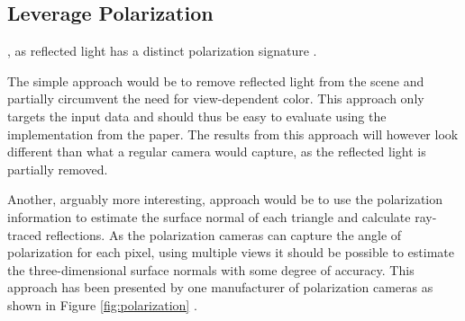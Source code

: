 \subsection{Leverage Polarization}

, as reflected light has a distinct polarization signature \cite{lingUniversityPhysicsVolume2016}.


The simple approach would be to remove reflected light from the scene and partially circumvent the need for view-dependent color.
This approach only targets the input data and should thus be easy to evaluate using the implementation from the paper.
The results from this approach will however look different than what a regular camera would capture, as the reflected light is partially removed.

Another, arguably more interesting, approach would be to use the polarization information to estimate the surface normal of each triangle and calculate ray-traced reflections.
As the polarization cameras can capture the angle of polarization for each pixel, using multiple views it should be possible to estimate the three-dimensional surface normals with some degree of accuracy.
This approach has been presented by one manufacturer of polarization cameras as shown in Figure \ref{fig:polarization} \cite{lucidvisionlabs3DDepthSurface2021}.


